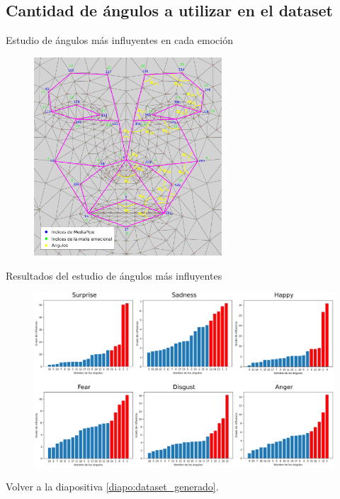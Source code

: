 \documentclass{beamer}
\begin{document}
\subsection{Cantidad de ángulos a utilizar en el dataset}
\begin{frame}{Estudio de ángulos más influyentes en cada emoción}
\begin{figure}[h!]
  \begin{center}
    \includegraphics[width=7cm]{figs/emotional_mesh_todos_angulos.png}
  \end{center}
\end{figure}

\end{frame}

\begin{frame}{Resultados del estudio de ángulos más influyentes}
\begin{center}
    \begin{figure}[h!]
  \includegraphics[width=11.5cm]{figs/resultados_angulos_influyentes_rojo.png}
\end{figure}
\end{center}
Volver a la diapositiva \ref{diapo:dataset_generado}.
\end{frame}
\end{document}
